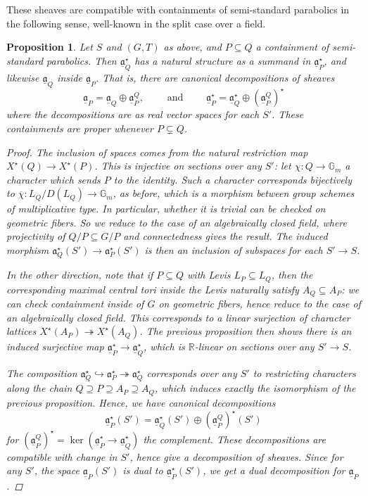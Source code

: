 \documentclass[openany]{amsbook}
\newtheorem{proposition}[theorem]{Proposition}
\theoremstyle{definition}
\theoremstyle{remark}
\numberwithin{equation}{section}
\newcommand{\R}{\mathbb{R}}
\newcommand{\G}{\mathbb{G}}
\newcommand{\ol}[1]{\overline{#1}}
\newcommand{\ul}[1]{\underline{#1}}
\renewcommand{\-}{\operatorname{-}}
\renewcommand{\a}{\mathfrak{a}}
\newcommand{\ga}{\ul{\a}}
\begin{document}
These sheaves are compatible with containments of semi-standard parabolics in the following sense, well-known in the split case over a field.
\begin{proposition}\label{prop.charshvs.decomp}
Let $S$ and $(G, T)$ as above, and $P \subseteq Q$ a containment of semi-standard parabolics. Then $\ga_Q^\star$ has a natural structure as a summand in $\ga_P^\star$, and likewise $\ga_Q$ inside $\ga_P$. That is, there are canonical decompositions of sheaves 
\begin{equation}\label{eqn.parabcontaindecomp}
    \ul{\a}_P = \ul{\a}_Q \oplus \ul{\a}_P^Q, \qquad \text{ and } \qquad \ul{\a}_P^\star = \ul{\a}_Q^\star \oplus \left(\ul{\a}_P^Q\right)^\star
\end{equation}
where the decompositions are as real vector spaces for each $S'$. These containments are proper whenever $P \subsetneq Q$.
    \begin{proof}
        The inclusion of spaces comes from the natural restriction map $X^\star(Q) \to X^\star(P)$. This is injective on sections over any $S'$: let $\chi : Q \to \G_m$ a character which sends $P$ to the identity. Such a character corresponds bijectively to $\ol{\chi} : L_Q/D(L_Q) \to \G_m$, as before, which is a morphism between group schemes of multiplicative type. In particular, whether it is trivial can be checked on geometric fibers. So we reduce to the case of an algebraically closed field, where projectivity of $Q/P \subseteq G/P$ and connectedness gives the result. The induced morphism $\a^\star_Q(S') \to \a^\star_P(S')$ is then an inclusion of subspaces for each $S' \to S$. 

        In the other direction, note that if $P \subseteq Q$ with Levis $L_P \subseteq L_Q$, then the corresponding maximal central tori inside the Levis naturally satisfy $A_Q \subseteq A_P$: we can check containment inside of $G$ on geometric fibers, hence reduce to the case of an algebraically closed field. This corresponds to a linear surjection of character lattices $X^\star(A_P) \twoheadrightarrow X^\star(A_Q)$. The previous proposition then shows there is an induced surjective map $\ul{\a}^\star_P \to \ul{\a}^\star_Q$, which is $\R$-linear on sections over any $S' \to S$. 

        The composition $\a^\star_Q \hookrightarrow \a^\star_P \twoheadrightarrow \a^\star_Q$ corresponds over any $S'$ to restricting characters along the chain $Q \supseteq P \supseteq A_P \supseteq A_Q$, which induces exactly the isomorphism of the previous proposition. Hence, we have canonical decompositions
        \[
            \ul{\a}_P^\star(S') = \ul{\a}_Q^\star(S') \oplus \left(\ul{\a}_P^Q\right)^\star(S')
        \]
        for $\left(\ul{\a}_P^Q\right)^\star = \ker(\ul{\a}_P^\star \to \ul{\a}_Q^\star)$ the complement. These decompositions are compatible with change in $S'$, hence give a decomposition of sheaves. Since for any $S'$, the space $\ul{\a}_P(S')$ is dual to $\ul{\a}_P^\star(S')$, we get a dual decomposition for $\ul{\a}_P$.
    \end{proof}
\end{proposition}
\end{document}
